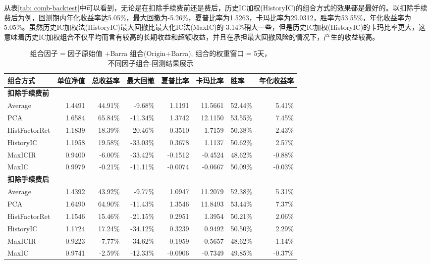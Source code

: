\documentclass[11pt]{article}
\begin{document}
从表\ref{tab: comb-backtest}中可以看到，无论是在扣除手续费前还是费后，历史IC加权(HistoryIC)的组合方式的效果都是最好的。以扣除手续费后为例，回测期内年化收益率达5.05\%，最大回撤为-5.26\%，夏普比率为1.5263，卡玛比率为29.0312，胜率为53.55\%，年化收益率为5.05\%。虽然历史IC加权法(HistoryIC)最大回撤比最大化IC法(MaxIC)的-3.14\%稍大一些，但是历史IC加权(HistoryIC)的卡玛比率更大，这意味着历史IC加权组合不仅平均而言有较高的长期收益和超额收益，并且在承担最大回撤风险的情况下，产生的收益较高。

\begin{table}[htbp]
  \centering
  \captionsetup{justification=centering}
  \caption{组合因子 = 因子原始值 +Barra 组合(Origin+Barra), 组合的权重窗口 = 5天，\\ 不同因子组合-回测结果展示}
    \begin{tabular}{lrrrrrrr}
    \toprule
    组合方式  & \multicolumn{1}{l}{单位净值} & \multicolumn{1}{l}{总收益率} & \multicolumn{1}{l}{最大回撤} & \multicolumn{1}{l}{夏普比率} & \multicolumn{1}{l}{卡玛比率} & \multicolumn{1}{l}{胜率} & \multicolumn{1}{l}{年化收益率}\\
    \midrule
    \textbf{扣除手续费前} &       &       &       &       &       &       &  \\
    Average & 1.4491  & 44.91\% & -9.68\% & 1.1191  & 11.5661  & 52.44\% & 5.41\% \\
    \rowcolor[rgb]{ .851,  .851,  .851} PCA   & 1.6584  & 65.84\% & -11.34\% & 1.3742  & 12.1150  & 53.55\% & 7.45\% \\
    HistFactorRet & 1.1839  & 18.39\% & -20.46\% & 0.3510  & 1.7159  & 50.38\% & 2.43\% \\
    HistoryIC & 1.1958  & 19.58\% & -33.03\% & 0.3678  & 1.1137  & 50.62\% & 2.57\% \\
    MaxICIR & 0.9400  & -6.00\% & -33.42\% & -0.1512  & -0.4524  & 48.62\% & -0.88\% \\
    MaxIC & 0.9979  & -0.21\% & -11.11\% & -0.0074  & -0.0667  & 50.09\% & -0.03\% \\
    \hline
    \textbf{扣除手续费后} &       &       &       &       &       &       &  \\
    Average & 1.4392  & 43.92\% & -9.77\% & 1.0947  & 11.2079  & 52.38\% & 5.31\% \\
    \rowcolor[rgb]{ .851,  .851,  .851} PCA   & 1.6490  & 64.90\% & -11.43\% & 1.3546  & 11.8493  & 53.44\% & 7.37\% \\
    HistFactorRet & 1.1546  & 15.46\% & -21.15\% & 0.2951  & 1.3954  & 50.21\% & 2.06\% \\
    HistoryIC & 1.1724  & 17.24\% & -34.12\% & 0.3239  & 0.9492  & 50.50\% & 2.29\% \\
    MaxICIR & 0.9223  & -7.77\% & -34.62\% & -0.1959  & -0.5657  & 48.62\% & -1.14\% \\
    MaxIC & 0.9741  & -2.59\% & -12.33\% & -0.0906  & -0.7349  & 49.85\% & -0.37\% \\
    \bottomrule
    \end{tabular}%
  \label{tab:ori+barra 5d backtest}%
\end{table}%
\end{document}
